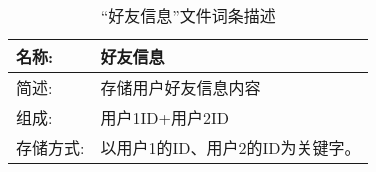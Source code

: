 \begin{table}[H]  
\caption{“好友信息”文件词条描述}  
\begin{center}  
    \begin{tabular}{l p{10cm}} 
        \hline
        \quad 名称:  &   好友信息 \\
        \hline
        \quad 简述:  & 存储用户好友信息内容\\
        \hline
        \quad 组成:  & 用户1ID+用户2ID \\
        \hline
        \quad 存储方式:  & 以用户1的ID、用户2的ID为关键字。 \\
        \hline
    \end{tabular}
    \label{tab1}
\end{center}
\end{table}
